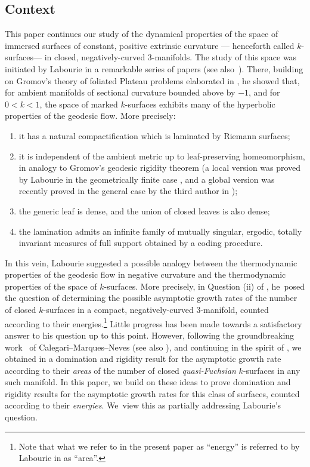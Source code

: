 \documentclass[JEP,XML,SOM,Unicode,NoEqCountersInSection,published]{cedram}
\newcommand{\ksurfaces}{$k$\nobreakdash-surfaces\xspace}
\theoremstyle{plain}
\theoremstyle{definition}
\begin{document}
\subsection{Context}
This paper continues our study of the dynamical properties of the space of immersed surfaces of constant, positive extrinsic curvature --- henceforth called \ksurfaces --- in closed, negatively-curved $3$\nobreakdash-manifolds. The study of this space was initiated by Labourie in a remarkable series of papers \cite{LabourieGAFA,LabourieInvent,LabourieAnnals} (see also~\cite{Labourie_phase_space}). There, building on Gromov's theory of foliated Plateau problems elaborated in \hbox{\cite{Gromov_FolPlateau1,Gromov_FolPlateau2}}, he showed that, for ambient manifolds of sectional curvature bounded above by $-1$, and for $0<k<1$, the space of marked \ksurfaces exhibits many of the hyperbolic properties of the geodesic flow. More precisely:
\begin{enumerate}
\item it has a natural compactification which is laminated by Riemann surfaces;
\item it is independent of the ambient metric up to leaf-preserving homeomorphism, in analogy to Gromov's geodesic rigidity theorem \cite{Gromov3} (a local version was proved by Labourie in the geometrically finite case \cite{LabourieInvent}, and a global version was recently proved in the general case by the third author in \cite{Smith_asymp});
\item the generic leaf is dense, and the union of closed leaves is also dense;
\item the lamination admits an infinite family of mutually singular, ergodic, totally invariant measures of full support obtained by a coding procedure.
\end{enumerate}

In this vein, Labourie suggested a possible analogy between the thermodynamic properties of the geodesic flow in negative curvature and the thermodynamic properties of the space of \ksurfaces \cite{LabourieInvent,Labourie_phase_space}. More precisely, in Question (ii) of \cite[\S1.2]{LabourieInvent}, he~posed the question of determining the possible asymptotic growth rates of the number of closed \ksurfaces in a compact, negatively-curved $3$\nobreakdash-manifold, counted according to their energies.\footnote{Note that what we refer to in the present paper as ``energy'' is referred to by Labourie in \cite{LabourieInvent} as ``area''.} Little progress has been made towards a satisfactory answer to his question up to this point. However, following the groundbreaking work~\cite{CMN} of Calegari--Marques--Neves (see also \cite{LabourieBourbaki}), and continuing in the spirit of \cite{BCG}, we obtained in \cite{ALS} a domination and rigidity result for the asymptotic growth rate according to their \emph{areas} of the number of closed \emph{quasi-Fuchsian} \ksurfaces in any such manifold. In this paper, we build on these ideas to prove domination and rigidity results for the asymptotic growth rates for this class of surfaces, counted according to their \textit{energies}. We~view this as partially addressing Labourie's question.
\end{document}

